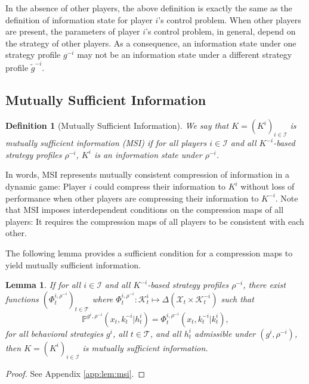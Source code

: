 \documentclass[pdflatex,sn-basic]{sn-jnl}
\renewcommand{\Pr}{\mathbb{P}}
\newcommand{\Comp}{K}
\newcommand{\comp}{k}
\newcommand{\Compset}{\mathcal{K}}
\theoremstyle{thmstyleone}%
\newtheorem{lemma}{Lemma}
\theoremstyle{thmstyletwo}%
\theoremstyle{thmstylethree}%
\newtheorem{defn}{Definition}
\begin{document}
In the absence of other players, the above definition is exactly the same as the definition of information state for player $i$'s control problem. When other players are present, the parameters of player $i$'s control problem, in general, depend on the strategy of other players. As a consequence, an information state under one strategy profile $g^{-i}$ may not be an information state under a different strategy profile $\tilde{g}^{-i}$.

\subsection{Mutually Sufficient Information}\label{sec:msi}
\begin{defn}[Mutually Sufficient Information]\label{def:msi}
	We say that $\Comp=(\Comp^i)_{i\in\mathcal{I}}$ is \emph{mutually sufficient information} (MSI) if for all players $i\in\mathcal{I}$ and all $\Comp^{-i}$-based strategy profiles $\rho^{-i}$, $\Comp^i$ is an information state under $\rho^{-i}$.
\end{defn}

In words, MSI represents mutually consistent compression of information in a dynamic game: Player $i$ could compress their information to $\Comp^i$ without loss of performance when other players are compressing their information to $\Comp^{-i}$. Note that MSI imposes interdependent conditions on the compression maps of all players: It requires the compression maps of all players to be consistent with each other.

The following lemma provides a sufficient condition for a compression maps to yield mutually sufficient information.

\begin{lemma}\label{lem:msi}
	If for all $i\in\mathcal{I}$ and all $\Comp^{-i}$-based strategy profiles $\rho^{-i}$, there exist functions $(\Phi_t^{i, \rho^{-i}})_{t\in\mathcal{T}}$ where $\Phi_t^{i, \rho^{-i}}\colon\Compset_t^i \mapsto \Delta(\mathcal{X}_t\times \Compset_t^{-i})$ such that
	\begin{equation}
		\Pr^{g^i, \rho^{-i}}(x_t, \comp_t^{-i}|h_t^i) = \Phi_t^{i,\rho^{-i}}(x_t, \comp_t^{-i}|\comp_t^i),
	\end{equation}
	for all behavioral strategies $g^i$, all $t\in\mathcal{T}$, and all $h_t^i$ admissible under $(g^i, \rho^{-i})$, then $\Comp=(\Comp^i)_{i\in\mathcal{I}}$ is mutually sufficient information.
\end{lemma}
\begin{proof}
    See Appendix \ref{app:lem:msi}.
\end{proof}
\end{document}
